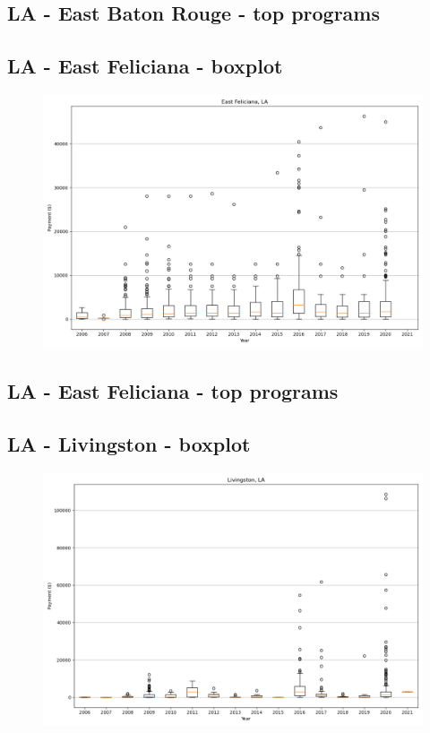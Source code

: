 \subsection*{LA - East Baton Rouge - top programs}

\newpage
\subsection*{LA - East Feliciana - boxplot}
\begin{figure}[h]
\centering
\includegraphics[width=7in]{../output/boxplots/counties/East Feliciana-LA_boxplot.png}
\end{figure}


\subsection*{LA - East Feliciana - top programs}

\newpage
\subsection*{LA - Livingston - boxplot}
\begin{figure}[h]
\centering
\includegraphics[width=7in]{../output/boxplots/counties/Livingston-LA_boxplot.png}
\end{figure}


